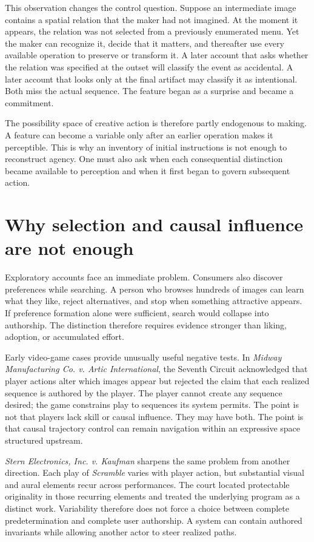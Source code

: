 \documentclass[11pt]{article}
\begin{document}
This observation changes the control question. Suppose an intermediate image contains a spatial relation that the maker had not imagined. At the moment it appears, the relation was not selected from a previously enumerated menu. Yet the maker can recognize it, decide that it matters, and thereafter use every available operation to preserve or transform it. A later account that asks whether the relation was specified at the outset will classify the event as accidental. A later account that looks only at the final artifact may classify it as intentional. Both miss the actual sequence. The feature began as a surprise and became a commitment.

The possibility space of creative action is therefore partly endogenous to making. A feature can become a variable only after an earlier operation makes it perceptible. This is why an inventory of initial instructions is not enough to reconstruct agency. One must also ask when each consequential distinction became available to perception and when it first began to govern subsequent action.

\section{Why selection and causal influence are not enough}
Exploratory accounts face an immediate problem. Consumers also discover preferences while searching. A person who browses hundreds of images can learn what they like, reject alternatives, and stop when something attractive appears. If preference formation alone were sufficient, search would collapse into authorship. The distinction therefore requires evidence stronger than liking, adoption, or accumulated effort.

Early video-game cases provide unusually useful negative tests. In \textit{Midway Manufacturing Co. v. Artic International}, the Seventh Circuit acknowledged that player actions alter which images appear but rejected the claim that each realized sequence is authored by the player. The player cannot create any sequence desired; the game constrains play to sequences its system permits.\cite{midway1983} The point is not that players lack skill or causal influence. They may have both. The point is that causal trajectory control can remain navigation within an expressive space structured upstream.

\textit{Stern Electronics, Inc. v. Kaufman} sharpens the same problem from another direction. Each play of \textit{Scramble} varies with player action, but substantial visual and aural elements recur across performances. The court located protectable originality in those recurring elements and treated the underlying program as a distinct work.\cite{stern1982} Variability therefore does not force a choice between complete predetermination and complete user authorship. A system can contain authored invariants while allowing another actor to steer realized paths.
\end{document}

